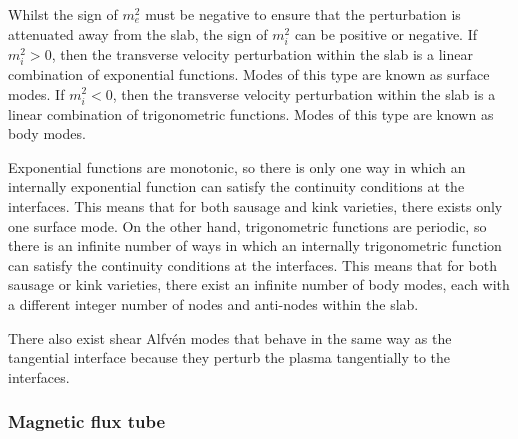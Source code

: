 Whilst the sign of $m_e^2$ must be negative to ensure that the perturbation is attenuated away from the slab, the sign of $m_i^2$ can be positive or negative. If $m_i^2 > 0$, then the transverse velocity perturbation within the slab is a linear combination of exponential functions. Modes of this type are known as surface modes. If $m_i^2 < 0$, then the transverse velocity perturbation within the slab is a linear combination of trigonometric functions. Modes of this type are known as body modes.

Exponential functions are monotonic, so there is only one way in which an internally exponential function can satisfy the continuity conditions at the interfaces. This means that for both sausage and kink varieties, there exists only one surface mode. On the other hand, trigonometric functions are periodic, so there is an infinite number of ways in which an internally trigonometric function can satisfy the continuity conditions at the interfaces. This means that for both sausage or kink varieties, there exist an infinite number of body modes, each with a different integer number of nodes and anti-nodes within the slab.

There also exist shear Alfv\'{e}n modes that behave in the same way as the tangential interface because they perturb the plasma tangentially to the interfaces.


\subsubsection{Magnetic flux tube} \label{sec: MHD waves tube}

